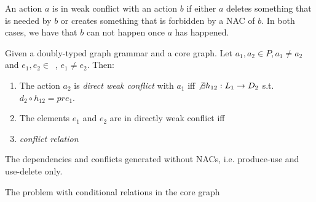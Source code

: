 \begin{intuition} An action $a$ is in weak conflict with an action $b$ if either $a$ deletes something that is needed by $b$ or creates something that is forbidden by a NAC of $b$. In both cases, we have that $b$ can not happen once $a$ has happened.
\end{intuition}


\begin{definition} Given \doublyTypedGraphGrammarCore{} a doubly-typed graph grammar and \coreGraph{} a core graph. Let $a_1, a_2 \in P, a_1 \ne a_2$ and \mbox{$e_1, e_2 \in $ \coreGraph{},} $e_1 \ne e_2$. Then: 

  \begin{enumerate}
    \item The action $a_2$ is \emph{direct weak conflict} with $a_1$ iff $\not\exists h_{12} : L_1 \rightarrow D_2$ s.t. \mbox{$d_2 \circ h_{12} = pre_1$}.

   \item The elements $e_1$ and $e_2$ are in directly weak conflict iff 
    \item \emph{conflict relation}
  \end{enumerate}
\end{definition}

\begin{definition} The dependencies and conflicts generated without NACs, i.e. produce-use and use-delete only.
\end{definition}

The problem with conditional relations in the core graph

